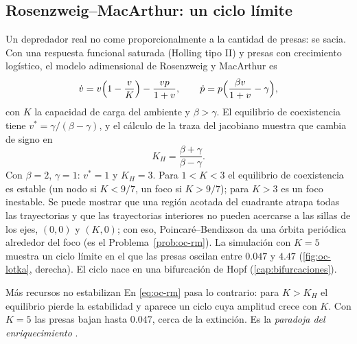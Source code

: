 \subsection{Rosenzweig--MacArthur: un ciclo límite}

Un depredador real no come proporcionalmente a la cantidad de presas: se sacia. Con una respuesta funcional saturada (Holling tipo II) y presas con crecimiento logístico, el modelo adimensional de Rosenzweig y MacArthur \citep{RoMa63} es
\begin{equation}
  \dot v=v\Bigl(1-\frac vK\Bigr)-\frac{vp}{1+v},\qquad\dot p=p\Bigl(\frac{\beta v}{1+v}-\gamma\Bigr),
  \label{eq:oc-rm}
\end{equation}
con $K$ la capacidad de carga del ambiente y $\beta>\gamma$. El equilibrio de coexistencia tiene $v^*=\gamma/(\beta-\gamma)$, y el cálculo de la traza del jacobiano muestra que cambia de signo en
\[
  K_H=\frac{\beta+\gamma}{\beta-\gamma} .
\]
Con $\beta=2$, $\gamma=1$: $v^*=1$ y $K_H=3$. Para $1<K<3$ el equilibrio de coexistencia es estable (un nodo si $K<9/7$, un foco si $K>9/7$); para $K>3$ es un foco inestable. Se puede mostrar que una región acotada del cuadrante atrapa todas las trayectorias y que las trayectorias interiores no pueden acercarse a las sillas de los ejes, $(0,0)$ y $(K,0)$; con eso, Poincaré--Bendixson da una órbita periódica alrededor del foco (es el Problema~\ref{prob:oc-rm}). La simulación con $K=5$ muestra un ciclo límite en el que las presas oscilan entre $0.047$ y $4.47$ (\cref{fig:oc-lotka}, derecha). El ciclo nace en una bifurcación de Hopf (\cref{cap:bifurcaciones}).


\begin{trampa}[label=tr:oc-enriquecer]{Más recursos no estabilizan}
En \eqref{eq:oc-rm} pasa lo contrario: para $K>K_H$ el equilibrio pierde la estabilidad y aparece un ciclo cuya amplitud crece con $K$. Con $K=5$ las presas bajan hasta $0.047$, cerca de la extinción. Es la \emph{paradoja del enriquecimiento} \citep{Ros71}.
\end{trampa}


